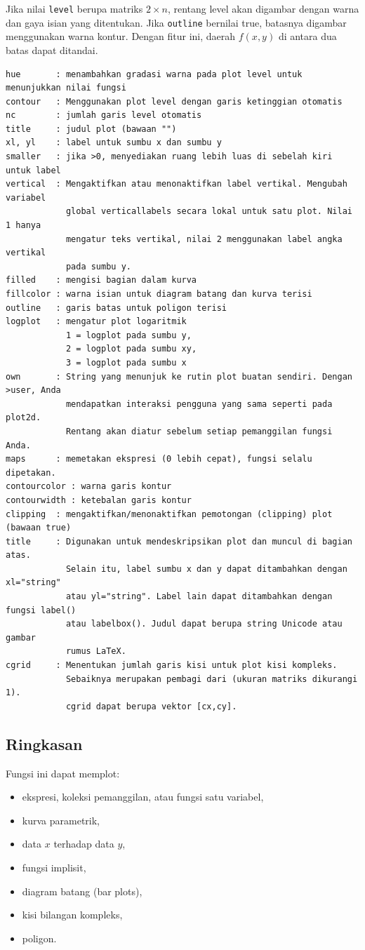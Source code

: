 \documentclass[11pt, a4paper]{article}
\begin{document}
Jika nilai \texttt{level} berupa matriks $2 \times n$, rentang level akan digambar dengan warna dan gaya isian yang ditentukan. Jika \texttt{outline} bernilai true, batasnya digambar menggunakan warna kontur. Dengan fitur ini, daerah $f(x,y)$ di antara dua batas dapat ditandai.

\begin{verbatim}
hue       : menambahkan gradasi warna pada plot level untuk menunjukkan nilai fungsi
contour   : Menggunakan plot level dengan garis ketinggian otomatis
nc        : jumlah garis level otomatis
title     : judul plot (bawaan "")
xl, yl    : label untuk sumbu x dan sumbu y
smaller   : jika >0, menyediakan ruang lebih luas di sebelah kiri untuk label
vertical  : Mengaktifkan atau menonaktifkan label vertikal. Mengubah variabel
            global verticallabels secara lokal untuk satu plot. Nilai 1 hanya
            mengatur teks vertikal, nilai 2 menggunakan label angka vertikal
            pada sumbu y.
filled    : mengisi bagian dalam kurva
fillcolor : warna isian untuk diagram batang dan kurva terisi
outline   : garis batas untuk poligon terisi
logplot   : mengatur plot logaritmik
            1 = logplot pada sumbu y,
            2 = logplot pada sumbu xy,
            3 = logplot pada sumbu x
own       : String yang menunjuk ke rutin plot buatan sendiri. Dengan >user, Anda
            mendapatkan interaksi pengguna yang sama seperti pada plot2d.
            Rentang akan diatur sebelum setiap pemanggilan fungsi Anda.
maps      : memetakan ekspresi (0 lebih cepat), fungsi selalu dipetakan.
contourcolor : warna garis kontur
contourwidth : ketebalan garis kontur
clipping  : mengaktifkan/menonaktifkan pemotongan (clipping) plot (bawaan true)
title     : Digunakan untuk mendeskripsikan plot dan muncul di bagian atas.
            Selain itu, label sumbu x dan y dapat ditambahkan dengan xl="string"
            atau yl="string". Label lain dapat ditambahkan dengan fungsi label()
            atau labelbox(). Judul dapat berupa string Unicode atau gambar
            rumus LaTeX.
cgrid     : Menentukan jumlah garis kisi untuk plot kisi kompleks.
            Sebaiknya merupakan pembagi dari (ukuran matriks dikurangi 1).
            cgrid dapat berupa vektor [cx,cy].
\end{verbatim}

\subsection*{Ringkasan}

Fungsi ini dapat memplot:
\begin{itemize}
    \item ekspresi, koleksi pemanggilan, atau fungsi satu variabel,
    \item kurva parametrik,
    \item data $x$ terhadap data $y$,
    \item fungsi implisit,
    \item diagram batang (bar plots),
    \item kisi bilangan kompleks,
    \item poligon.
\end{itemize}
\end{document}
